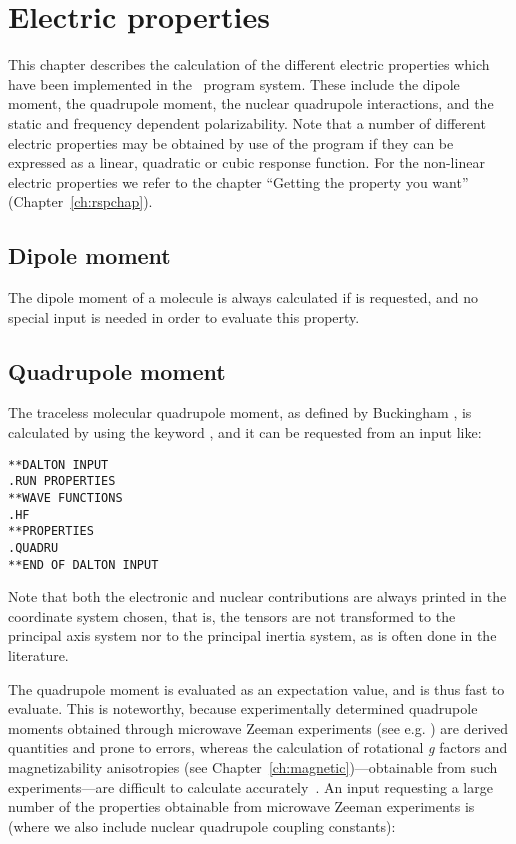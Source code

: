 \chapter{Electric properties}\label{ch:electric}

This chapter describes the calculation of the different electric
properties which have been implemented in the \siraba\ program system.
These include the dipole moment, the quadrupole
moment, the nuclear quadrupole
interactions, and the static and frequency dependent
polarizability. Note that a number of different electric
properties may be
obtained by use of the {\resp} program if they can be expressed as a
linear, quadratic or cubic response function. For the non-linear
electric properties we refer to the chapter ``Getting the property you
want'' (Chapter~\ref{ch:rspchap}).

\section{Dipole moment}\label{sec:dipmom}

The dipole moment of a  molecule is always
calculated if  is
requested, and no special input is needed in order to evaluate this property.

\section{Quadrupole moment}\label{sec:quadmom}

The traceless molecular quadrupole moment, as
defined by Buckingham
\cite{adbacp12}, is calculated by using the keyword , and
it can be requested from an input like:

\begin{verbatim}
**DALTON INPUT
.RUN PROPERTIES
**WAVE FUNCTIONS
.HF
**PROPERTIES
.QUADRU
**END OF DALTON INPUT
\end{verbatim}

Note that both the electronic and nuclear contributions are always
printed in the coordinate system chosen, that is, the tensors are not
transformed to the principal axis system nor to the principal inertia
system, as is often done in the literature.

The quadrupole moment is evaluated as an expectation value, and is
thus fast to evaluate. This is noteworthy, because experimentally
determined quadrupole moments obtained through microwave Zeeman experiments
(see e.g.  \cite{whmklwhfjcp48,jsdhszna46}) are derived
quantities and prone to errors,
whereas the calculation of rotational {\em g} factors and magnetizability
anisotropies (see Chapter~\ref{ch:magnetic})---obtainable from such
experiments---are difficult to calculate accurately~\cite{krthcpl264}. An input
requesting a large number of the properties obtainable from microwave
Zeeman experiments is (where we also include nuclear quadrupole
coupling constants):

